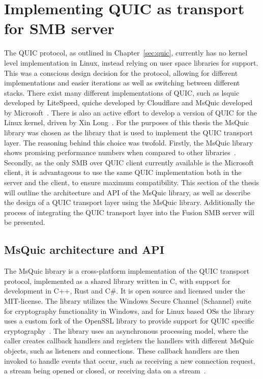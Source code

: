 \documentclass[english, 12pt, a4paper, elec, utf8, a-2b, online]{aaltothesis}
\begin{document}
\clearpage
\section{Implementing QUIC as transport for SMB server}
\label{sec:implementation}
The QUIC protocol, as outlined in Chapter~\ref{sec:quic}, currently has no kernel
level implementation in Linux, instead relying on user space libraries for support.
This was a conscious design decision for the protocol, allowing for different
implementations and easier iterations as well as switching between different stacks.
There exist many different implementations of QUIC, such as lsquic developed by
LiteSpeed, quiche developed by Cloudflare and MsQuic developed by Microsoft~\cite{quic_implementations}.
There is also an active effort to develop a version of QUIC for the Linux kernel,
driven by Xin Long~\cite{quic_linux_kernel}. For the purposes of this thesis the
MsQuic library was chosen as the library that is used to implement the QUIC transport
layer. The reasoning behind this choice was twofold. Firstly, the MsQuic library
shows promising performance numbers when compared to other libraries~\cite{quic_perf}.
Secondly, as the only SMB over QUIC client currently available is the Microsoft client, it is
advantageous to use the same QUIC implementation both in the server and the client,
to ensure maximum compatibility. This section of the thesis will outline the
architecture and API of the MsQuic library, as well as describe the design of
a QUIC transport layer using the MsQuic library. Additionally the process of integrating
the QUIC transport layer into the Fusion SMB server will be presented.

\subsection{MsQuic architecture and API}
\label{sec:msquic}
The MsQuic library is a cross-platform implementation of the QUIC transport protocol,
implemented as a shared library written in C, with support for development
in C++, Rust and C\#. It is open source and licensed under the MIT-license. The library
utilizes the Windows Secure Channel (Schannel) suite for cryptography functionality
in Windows, and for Linux based OSs the library uses a custom fork of the
OpenSSL library to provide support for QUIC specific cryptography~\cite{msquic}. The
library uses an asynchronous processing model, where the caller creates callback handlers
and registers the handlers with different MsQuic objects, such as listeners and connections.
These callback handlers are then invoked to handle events that occur, such as receiving
a new connection request, a stream being opened or closed, or receiving data on a stream~\cite{msquic_docs}. 
\end{document}
